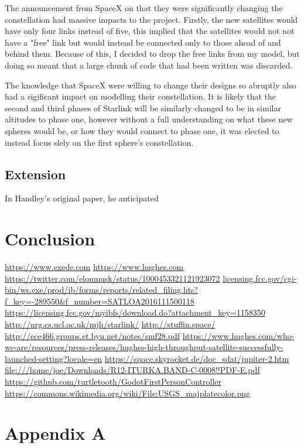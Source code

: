 \documentclass[12pt]{article}
\begin{document}
The announcement from SpaceX on that they were significantly changing the constellation had massive impacts to the project. Firstly, the new satellites would have only four links instead of five, this implied that the satellites would not not have a "free" link but would instead be connected only to those ahead of and behind them. Because of this, I decided to drop the free links from my model, but doing so meant that a large chunk of code that had been written was discarded.

The knowledge that SpaceX were willing to change their designs so abruptly also had a sigificant impact on modelling their constellation. It is likely that the second and third phases of Starlink will be similarly changed to be in similar altitudes to phase one, however without a full understanding on what these new spheres would be, or how they would connect to phase one, it was elected to instead focus slely on the first sphere's constellation. %

\subsection{Extension}

In Handley's original paper, he anticipated 

\section{Conclusion}


\begin{thebibliography}{99}
	 \url{https://www.exede.com}
	 \url{https://www.hughes.com}
	 \url{https://twitter.com/elonmusk/status/1000453321121923072}
	 \url{licensing.fcc.gov/cgi-bin/ws.exe/prod/ib/forms/reports/related_filing.hts?f_key=-289550&f_number=SATLOA2016111500118}
	 \url{https://licensing.fcc.gov/myibfs/download.do?attachment_key=1158350}
	 \url{http://nrg.cs.ucl.ac.uk/mjh/starlink/}
	 \url{http://stuffin.space/}
	 \url{http://ece466.groups.et.byu.net/notes/smf28.pdf}
	 \url{https://www.hughes.com/who-we-are/resources/press-releases/hughes-high-throughput-satellite-successfully-launched-setting?locale=en}
	 \url{https://space.skyrocket.de/doc_sdat/jupiter-2.htm}
	 \url{file:///home/joe/Downloads/R12-ITURKA.BAND-C-0008!!PDF-E.pdf}
	 \url{https://github.com/turtletooth/GodotFirstPersonController}
	 \url{https://commons.wikimedia.org/wiki/File:USGS_majplatecolor.png}
\end{thebibliography}
\appendix

\section{Appendix A}

\printindex

\end{document}
